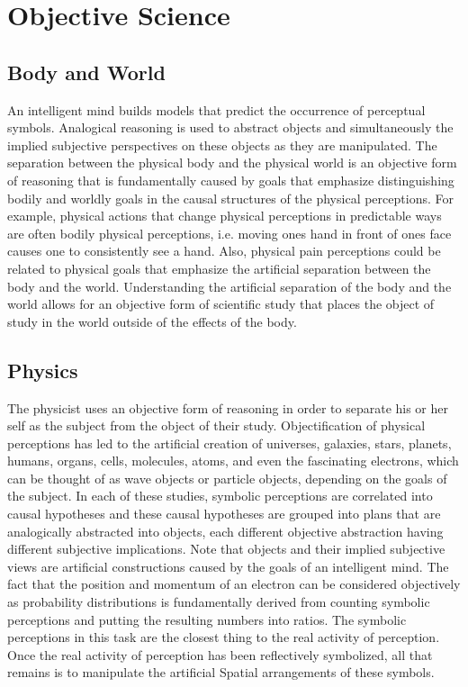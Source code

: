 \chapter{Objective Science}
\label{chapter:objective_science}

\section{Body and World}

An intelligent mind builds models that predict the occurrence of
perceptual symbols.  Analogical reasoning is used to abstract objects
and simultaneously the implied subjective perspectives on these
objects as they are manipulated.  The separation between the physical
body and the physical world is an objective form of reasoning that is
fundamentally caused by goals that emphasize distinguishing bodily and
worldly goals in the causal structures of the physical perceptions.
For example, physical actions that change physical perceptions in
predictable ways are often bodily physical perceptions, i.e. moving
ones hand in front of ones face causes one to consistently see a hand.
Also, physical pain perceptions could be related to physical goals
that emphasize the artificial separation between the body and the
world.  Understanding the artificial separation of the body and the
world allows for an objective form of scientific study that places the
object of study in the world outside of the effects of the body.

\section{Physics}

The physicist uses an objective form of reasoning in order to separate
his or her self as the subject from the object of their study.
Objectification of physical perceptions has led to the artificial
creation of universes, galaxies, stars, planets, humans, organs,
cells, molecules, atoms, and even the fascinating electrons, which can
be thought of as wave objects or particle objects, depending on the
goals of the subject.  In each of these studies, symbolic perceptions
are correlated into causal hypotheses and these causal hypotheses are
grouped into plans that are analogically abstracted into objects, each
different objective abstraction having different subjective
implications.  Note that objects and their implied subjective views
are artificial constructions caused by the goals of an intelligent
mind.  The fact that the position and momentum of an electron can be
considered objectively as probability distributions is fundamentally
derived from counting symbolic perceptions and putting the resulting
numbers into ratios.  The symbolic perceptions in this task are the
closest thing to the real activity of perception.  Once the real
activity of perception has been reflectively symbolized, all that
remains is to manipulate the artificial Spatial arrangements of these
symbols.

